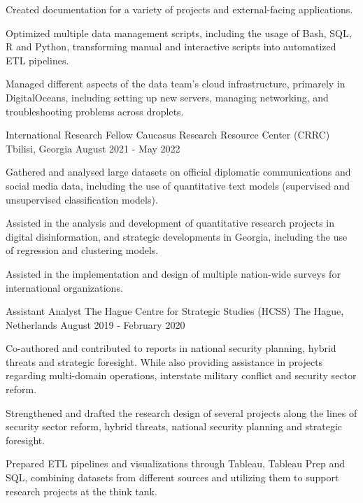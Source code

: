 \begin{cventries}
{\begin{cvitems}
        \item {Created documentation for a variety of projects and external-facing applications.}
        \item {Optimized multiple data management scripts, including the usage of Bash, SQL, R and Python, transforming manual and interactive scripts into automatized ETL pipelines.}
        \item {Managed different aspects of the data team's cloud infrastructure, primarely in DigitalOceans, including setting up new servers, managing networking, and troubleshooting problems across droplets.}
      \end{cvitems}
    }

  \cventry
    {International Research Fellow} %
    {Caucasus Research Resource Center (CRRC)} %
    {Tbilisi, Georgia} %
    {August 2021 - May 2022} %
    {
      \begin{cvitems} %
        \item {Gathered and analysed large datasets on official diplomatic communications and social media data, including the use of quantitative text models (supervised and unsupervised classification models).}
        \item {Assisted in the analysis and development of quantitative research projects in digital disinformation, and strategic developments in Georgia, including the use of regression and clustering models.}
        \item {Assisted in the implementation and design of multiple nation-wide surveys for international organizations.}
      \end{cvitems}
    }

  \cventry
    {Assistant Analyst} %
    {The Hague Centre for Strategic Studies (HCSS)} %
    {The Hague, Netherlands} %
    {August 2019 - February 2020} %
    {
      \begin{cvitems} %
        \item {Co-authored and contributed to reports in national security planning, hybrid threats and strategic foresight. While also providing assistance in projects regarding multi-domain operations, interstate military conflict and security sector reform.}
        \item {Strengthened and drafted the research design of several projects along the lines of security sector reform, hybrid threats, national security planning and strategic foresight.}
        \item {Prepared ETL pipelines and visualizations through Tableau, Tableau Prep and SQL, combining datasets from different sources and utilizing them to support research projects at the think tank.}
      \end{cvitems}
    }

\end{cventries}

